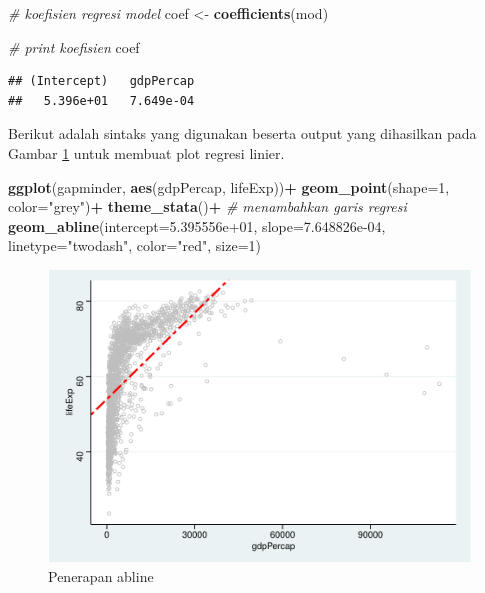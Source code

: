 \documentclass[]{book}
\newenvironment{Shaded}{\begin{snugshade}}{\end{snugshade}}
\newcommand{\KeywordTok}[1]{\textcolor[rgb]{0.13,0.29,0.53}{\textbf{#1}}}
\newcommand{\DataTypeTok}[1]{\textcolor[rgb]{0.13,0.29,0.53}{#1}}
\newcommand{\DecValTok}[1]{\textcolor[rgb]{0.00,0.00,0.81}{#1}}
\newcommand{\FloatTok}[1]{\textcolor[rgb]{0.00,0.00,0.81}{#1}}
\newcommand{\StringTok}[1]{\textcolor[rgb]{0.31,0.60,0.02}{#1}}
\newcommand{\CommentTok}[1]{\textcolor[rgb]{0.56,0.35,0.01}{\textit{#1}}}
\newcommand{\OperatorTok}[1]{\textcolor[rgb]{0.81,0.36,0.00}{\textbf{#1}}}
\newcommand{\NormalTok}[1]{#1}
\begin{document}
\begin{Shaded}
\begin{Highlighting}[]
\CommentTok{# koefisien regresi model}
\NormalTok{coef <-}\StringTok{ }\KeywordTok{coefficients}\NormalTok{(mod)}

\CommentTok{# print koefisien}
\NormalTok{coef}
\end{Highlighting}
\end{Shaded}

\begin{verbatim}
## (Intercept)   gdpPercap 
##   5.396e+01   7.649e-04
\end{verbatim}

Berikut adalah sintaks yang digunakan beserta output yang dihasilkan
pada Gambar \ref{fig:ggabline} untuk membuat plot regresi linier.

\begin{Shaded}
\begin{Highlighting}[]
\KeywordTok{ggplot}\NormalTok{(gapminder, }\KeywordTok{aes}\NormalTok{(gdpPercap, lifeExp))}\OperatorTok{+}
\StringTok{  }\KeywordTok{geom_point}\NormalTok{(}\DataTypeTok{shape=}\DecValTok{1}\NormalTok{, }\DataTypeTok{color=}\StringTok{"grey"}\NormalTok{)}\OperatorTok{+}
\StringTok{  }\KeywordTok{theme_stata}\NormalTok{()}\OperatorTok{+}
\StringTok{  }\CommentTok{# menambahkan garis regresi}
\StringTok{  }\KeywordTok{geom_abline}\NormalTok{(}\DataTypeTok{intercept=}\FloatTok{5.395556e+01}\NormalTok{,}
         \DataTypeTok{slope=}\FloatTok{7.648826e-04}\NormalTok{,}
         \DataTypeTok{linetype=}\StringTok{"twodash"}\NormalTok{,}
             \DataTypeTok{color=}\StringTok{"red"}\NormalTok{,}
             \DataTypeTok{size=}\DecValTok{1}\NormalTok{)}
\end{Highlighting}
\end{Shaded}

\begin{figure}

{\centering \includegraphics[width=0.7\linewidth]{EnvStat_files/figure-latex/ggabline-1} 

}

\caption{Penerapan abline}\label{fig:ggabline}
\end{figure}
\end{document}
